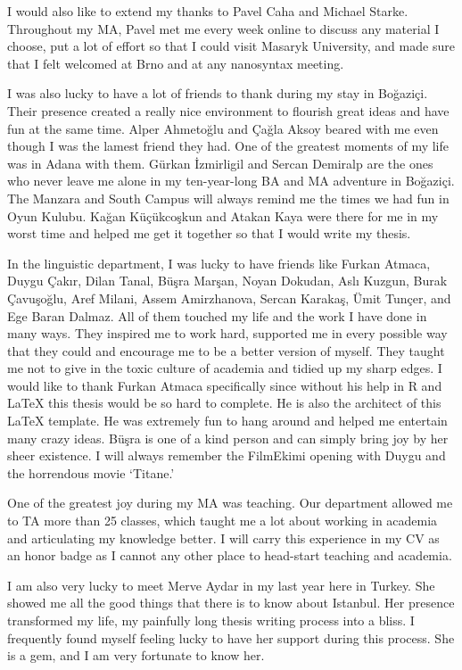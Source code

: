 I would also like to extend my thanks to Pavel Caha and Michael Starke. Throughout my MA, Pavel met me every week online to discuss any material I choose, put a lot of effort so that I could visit Masaryk University, and made sure that I felt welcomed at Brno and at any nanosyntax meeting. 

I was also lucky to have a lot of friends to thank during my stay in Bo\u{g}azi\c{c}i. Their presence created a really nice environment to flourish great ideas and have fun at the same time. Alper Ahmeto\u{g}lu and \c{C}a\u{g}la Aksoy beared with me even though I was the lamest friend they had. One of the greatest moments of my life was in Adana with them. G\"urkan \.Izmirligil and Sercan Demiralp are the ones who never leave me alone in my ten-year-long BA and MA adventure in Bo\u{g}azi\c{c}i. The Manzara and South Campus will always remind me the times we had fun in Oyun Kulubu. Ka\u{g}an K\"u\c{c}\"ukco\c{s}kun and Atakan Kaya were there for me in my worst time and helped me get it together so that I would write my thesis.

In the linguistic department, I was lucky to have friends like Furkan Atmaca, Duygu \c{C}ak{\i}r, Dilan Tanal, B\"u\c{s}ra Mar\c{s}an, Noyan Dokudan, Asl{\i} Kuzgun, Burak \c{C}avu\c{s}o\u{g}lu, Aref Milani, Assem Amirzhanova, Sercan Karaka\c{s}, \"Umit Tun\c{c}er, and Ege Baran Dalmaz. All of them touched my life and the work I have done in many ways. They inspired me to work hard, supported me in every possible way that they could and encourage me to be a better version of myself. They taught me not to give in the toxic culture of academia and tidied up my sharp edges. I would like to thank Furkan Atmaca specifically since without his help in R and \LaTeX{} this thesis would be so hard to complete. He is also the architect of this \LaTeX{} template. He was extremely fun to hang around and helped me entertain many crazy ideas. B\"u\c{s}ra is one of a kind person and can simply bring joy by her sheer existence. I will always remember the FilmEkimi opening with Duygu and the horrendous movie `Titane.'

One of the greatest joy during my MA was teaching. Our department allowed me to TA more than 25 classes, which taught me a lot about working in academia and articulating my knowledge better. I will carry this experience in my CV as an honor badge as I cannot any other place to head-start teaching and academia. 

I am also very lucky to meet Merve Aydar in my last year here in Turkey. She showed me all the good things that there is to know about Istanbul. Her presence transformed my life, my painfully long thesis writing process into a bliss. I frequently found myself feeling lucky to have her support during this process. She is a gem, and I am very fortunate to know her. 

